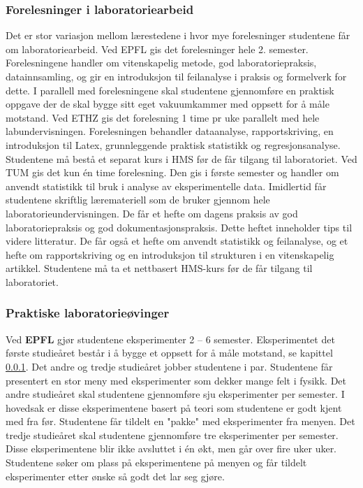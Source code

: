\documentclass{article}
\begin{document}
\subsubsection{Forelesninger i laboratoriearbeid}\label{forel_lab}
Det er stor variasjon mellom lærestedene i hvor mye forelesninger studentene får om laboratoriearbeid. 
Ved EPFL gis det forelesninger hele 2. semester. Forelesningene handler om vitenskapelig metode, god laboratoriepraksis, datainnsamling, og gir en introduksjon til feilanalyse i praksis og formelverk for dette. I parallell med forelesningene skal studentene gjennomføre en praktisk oppgave der de skal bygge sitt eget vakuumkammer med oppsett for å måle motstand. 
Ved ETHZ gis det forelesning 1 time pr uke parallelt med hele labundervisningen. Forelesningen behandler dataanalyse, rapportskriving, en introduksjon til Latex, grunnleggende praktisk statistikk og regresjonsanalyse. Studentene må bestå et separat kurs i HMS før de får tilgang til laboratoriet. 
Ved TUM gis det kun én time forelesning. Den gis i første semester og handler om anvendt statistikk til bruk i analyse av eksperimentelle data. Imidlertid får studentene skriftlig læremateriell som de bruker gjennom hele laboratorieundervisningen. De får et hefte om dagens praksis av god laboratoriepraksis og god dokumentasjonspraksis. Dette heftet inneholder tips til videre litteratur. De får også et hefte om anvendt statistikk og feilanalyse, og et hefte om rapportskriving og en introduksjon til strukturen i en vitenskapelig artikkel. Studentene må ta et nettbasert HMS-kurs før de får tilgang til laboratoriet. 

\subsubsection{Praktiske laboratorieøvinger}
Ved \textbf{EPFL} gjør studentene eksperimenter 2 – 6 semester. Eksperimentet det første studieåret består i å bygge et oppsett for å måle motstand, se kapittel \ref{forel_lab}. Det andre og tredje studieåret jobber studentene i par. Studentene får presentert en stor meny med eksperimenter som dekker mange felt i fysikk. Det andre studieåret skal studentene gjennomføre sju eksperimenter per semester. I hovedsak er disse eksperimentene basert på teori som studentene er godt kjent med fra før. Studentene får tildelt en "pakke" med eksperimenter fra menyen. Det tredje studieåret skal studentene gjennomføre tre eksperimenter per semester. Disse eksperimentene blir ikke avsluttet i én økt, men går over fire uker uker. Studentene søker om plass på eksperimentene på menyen og får tildelt eksperimenter etter ønske så godt det lar seg gjøre. 
 
\end{document}
